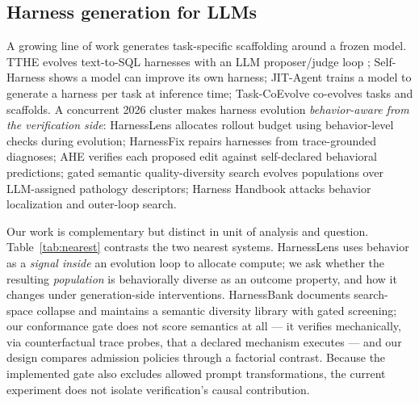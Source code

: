 \subsection{Harness generation for LLMs}\label{related:generation}
A growing line of work generates task-specific scaffolding around a frozen
model. TTHE evolves text-to-SQL harnesses with an LLM proposer/judge loop
\citep{tthe2026}; Self-Harness \citep{selfharness2026} shows a model can
improve its own harness; JIT-Agent \citep{jitagent2026} trains a model to
generate a harness per task at inference time; Task-CoEvolve
\citep{coevolve2026} co-evolves tasks and scaffolds. A concurrent 2026
cluster makes harness evolution \emph{behavior-aware from the verification
side}: HarnessLens \citep{harnesslens2026} allocates rollout budget using
behavior-level checks during evolution; HarnessFix \citep{harnessfix2026}
repairs harnesses from trace-grounded diagnoses; AHE \citep{ahe2026}
verifies each proposed edit against self-declared behavioral predictions;
gated semantic quality-diversity search \citep{gatedqd2026} evolves
populations over LLM-assigned pathology descriptors; Harness Handbook
\citep{handbook2026} attacks behavior localization and outer-loop search.

Our work is complementary but distinct in unit of analysis and question.
Table~\ref{tab:nearest} contrasts the two nearest systems. HarnessLens uses
behavior as a \emph{signal inside} an evolution loop to allocate compute;
we ask whether the resulting \emph{population} is behaviorally diverse as an
outcome property, and how it changes under generation-side interventions.
HarnessBank \citep{gatedqd2026} documents search-space collapse and
maintains a semantic diversity library with gated screening; our conformance
gate does not score semantics at all --- it verifies mechanically, via
counterfactual trace probes, that a declared mechanism executes --- and our
design compares admission policies through a factorial contrast.
Because the implemented gate also excludes allowed prompt transformations,
the current experiment does not isolate verification's causal contribution.

